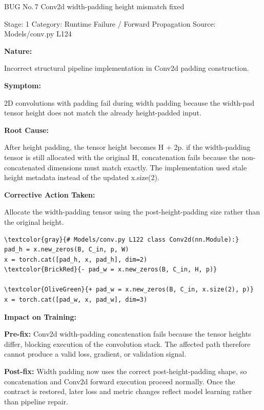 \documentclass[10pt]{article}
\newcommand{\FieldLabel}[1]{%
 {\bfseries #1:}\par
}
\begin{document}
\begin{bugbox}{BUG No.\,7 \quad Conv2d width-padding height mismatch fixed}
{\color{MetaGray}\small Stage: 1 \;\textbar\; Category: Runtime Failure / Forward Propagation \;\textbar\; Source: Models/conv.py L124\par}
\vspace{0.22em}
\FieldLabel{Nature}
Incorrect structural pipeline implementation in Conv2d padding construction.
\par
\vspace{0.35em}
\FieldLabel{Symptom}
2D convolutions with padding fail during width padding because the width-pad tensor height does not match the already height-padded input.
\par
\vspace{0.35em}
\FieldLabel{Root Cause}
After height padding, the tensor height becomes H + 2p. if the width-padding tensor is still allocated with the original H, concatenation fails because the non-concatenated dimensions must match exactly. The implementation used stale height metadata instead of the updated x.size(2).
\par
\vspace{0.35em}
\FieldLabel{Corrective Action Taken}
Allocate the width-padding tensor using the post-height-padding size rather than the original height.
\par
\vspace{0.35em}
\begin{Verbatim}[commandchars=\\\{\},fontsize=\footnotesize,breaklines=true,breaksymbol={},frame=leftline,framerule=2pt,rulecolor=\color{gray!40},xleftmargin=6pt,formatcom=\singlespacing]
\textcolor{gray}{# Models/conv.py L122 class Conv2d(nn.Module):}
pad_h = x.new_zeros(B, C_in, p, W)
x = torch.cat([pad_h, x, pad_h], dim=2)
\textcolor{BrickRed}{- pad_w = x.new_zeros(B, C_in, H, p)}

\textcolor{OliveGreen}{+ pad_w = x.new_zeros(B, C_in, x.size(2), p)}
x = torch.cat([pad_w, x, pad_w], dim=3)
\end{Verbatim}
\vspace{0.22em}
\FieldLabel{Impact on Training}
\textbf{Pre-fix:} Conv2d width-padding concatenation fails because the tensor heights differ, blocking execution of the convolution stack. The affected path therefore cannot produce a valid loss, gradient, or validation signal.\par\smallskip
\textbf{Post-fix:} Width padding now uses the correct post-height-padding shape, so concatenation and Conv2d forward execution proceed normally. Once the contract is restored, later loss and metric changes reflect model learning rather than pipeline repair.
\par
\vspace{0.35em}
\end{bugbox}
\end{document}
